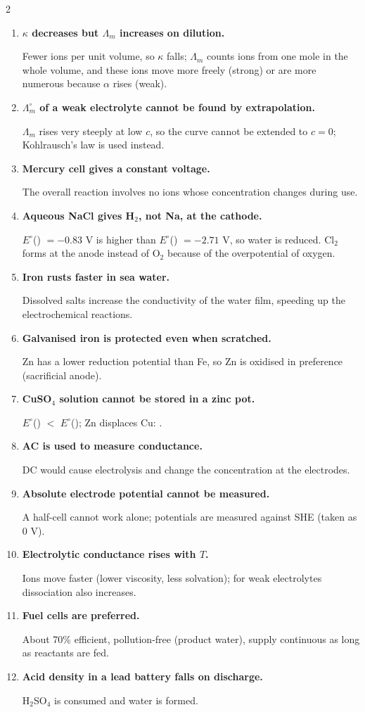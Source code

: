 \documentclass[10pt,a4paper]{extarticle}
\newenvironment{rqlist}{\begin{enumerate}[leftmargin=12pt,label={\sffamily\bfseries\scriptsize\color{uc}\arabic*.},itemsep=1pt]}{\end{enumerate}}
\newcommand{\ans}{\par\hspace*{2pt}{\color{uc}$\hookrightarrow$}\;}
\begin{document}
\begin{multicols}{2}
\begin{rqlist}
\item \textbf{$\kappa$ decreases but $\Lambda_m$ increases on dilution.}\ans Fewer ions per unit volume, so $\kappa$ falls; $\Lambda_m$ counts ions from one mole in the whole volume, and these ions move more freely (strong) or are more numerous because $\alpha$ rises (weak).
\item \textbf{$\Lambda^\circ_m$ of a weak electrolyte cannot be found by extrapolation.}\ans $\Lambda_m$ rises very steeply at low $c$, so the curve cannot be extended to $c=0$; Kohlrausch's law is used instead.
\item \textbf{Mercury cell gives a constant voltage.}\ans The overall reaction  involves no ions whose concentration changes during use.
\item \textbf{Aqueous NaCl gives H$_2$, not Na, at the cathode.}\ans $E^\circ$() $=-0.83$ V is higher than $E^\circ$() $=-2.71$ V, so water is reduced. Cl$_2$ forms at the anode instead of O$_2$ because of the overpotential of oxygen.
\item \textbf{Iron rusts faster in sea water.}\ans Dissolved salts increase the conductivity of the water film, speeding up the electrochemical reactions.
\item \textbf{Galvanised iron is protected even when scratched.}\ans Zn has a lower reduction potential than Fe, so Zn is oxidised in preference (sacrificial anode).
\item \textbf{CuSO$_4$ solution cannot be stored in a zinc pot.}\ans $E^\circ$() $<$ $E^\circ$(); Zn displaces Cu: .
\item \textbf{AC is used to measure conductance.}\ans DC would cause electrolysis and change the concentration at the electrodes.
\item \textbf{Absolute electrode potential cannot be measured.}\ans A half-cell cannot work alone; potentials are measured against SHE (taken as 0 V).
\item \textbf{Electrolytic conductance rises with $T$.}\ans Ions move faster (lower viscosity, less solvation); for weak electrolytes dissociation also increases.
\item \textbf{Fuel cells are preferred.}\ans About 70\% efficient, pollution-free (product water), supply continuous as long as reactants are fed.
\item \textbf{Acid density in a lead battery falls on discharge.}\ans H$_2$SO$_4$ is consumed and water is formed.
\end{rqlist}


\end{multicols}
\end{document}
